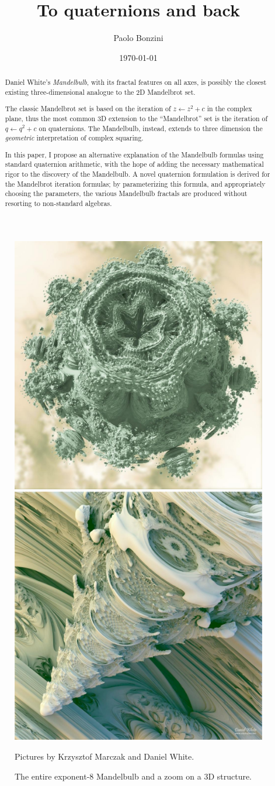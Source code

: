 \documentclass{article}
\title{To quaternions and back}
\date{\today}
\author{Paolo Bonzini}
\begin{document}
\maketitle


\thispagestyle{empty}
\begin{abstract}
  Daniel White's \emph{Mandelbulb}, with its fractal features on all axes,
  is possibly the closest existing three-dimensional analogue to the 2D
  Mandelbrot set.

  The classic Mandelbrot set is based on the iteration of $z\leftarrow
  z^2+c$ in the complex plane, thus the most common 3D extension
  to the ``Mandelbrot'' set is the iteration of $q\leftarrow q^2+c$
  on quaternions.  The Mandelbulb, instead, extends to three dimension
  the \emph{geometric} interpretation of complex squaring.

  In this paper, I propose an alternative explanation of the Mandelbulb
  formulas using standard quaternion arithmetic, with the hope of adding
  the necessary mathematical rigor to the discovery of the Mandelbulb.
  A novel quaternion formulation is derived for the Mandelbrot iteration
  formulas; by parameterizing this formula, and appropriately choosing
  the parameters, the various Mandelbulb fractals are produced without
  resorting to non-standard algebras.
\end{abstract}

\begin{figure}[!b]
\includegraphics[width=0.45\linewidth]{mbulb2.jpg}
\hfill
\includegraphics[width=0.45\linewidth]{mbulb.jpg}

\centering
\caption{The entire exponent-8 Mandelbulb and a zoom on a 3D structure.}
Pictures by Krzysztof Marczak and Daniel White.
\end{figure}
\end{document}

